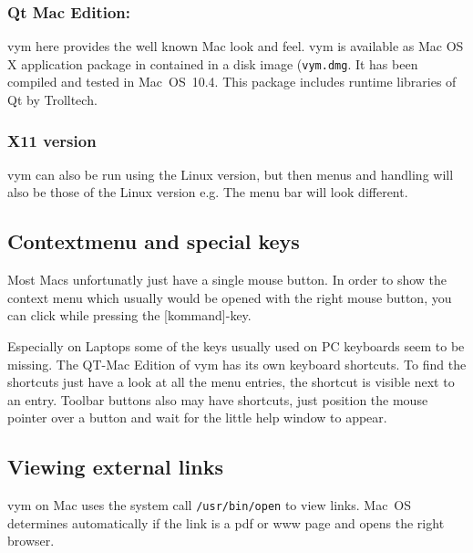 \documentclass[12pt,a4paper]{article}
\newcommand{\vym}{{\sc vym }}
\newcommand{\key}[1]{[#1]}
\begin{document}
\subsubsection*{Qt Mac Edition:}
    \vym here provides the well known Mac look and feel.  \vym is
    available as Mac OS X application package in contained in a disk
    image ({\tt vym.dmg}. It has been compiled and tested in
    Mac~OS~10.4.  This package includes  runtime libraries of Qt by
    Trolltech.
    
\subsubsection*{X11 version} \vym can also be run using the Linux
version, but then menus and handling will also be those of the Linux
version e.g. The menu bar will look different. 

\subsection {Contextmenu and special keys}
Most Macs unfortunatly just have a single mouse button. In order to show
the context menu which usually would be opened with the right mouse
button, you can click while pressing the \key{kommand}-key.

Especially on Laptops some of the keys usually used on PC keyboards seem
to be missing. The QT-Mac Edition of \vym has its own keyboard
shortcuts. To find the shortcuts just have a look at all the menu
entries, the shortcut is visible next to an entry. Toolbar buttons also
may have shortcuts, just position the mouse pointer over a button and
wait for the little help window to appear. 

\subsection {Viewing external links}
\vym on Mac uses the system call {\tt /usr/bin/open} to view links.
Mac~OS determines automatically if the link is a pdf or www page and
opens the right browser.


\newpage
\end{document}
